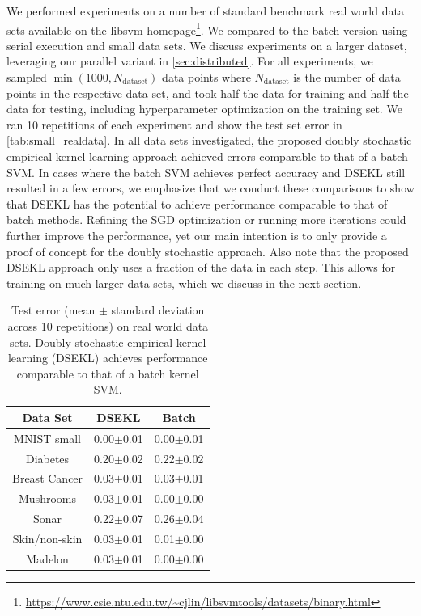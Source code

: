 \documentclass{article} %
\begin{document}
We performed experiments on a number of standard benchmark real world data sets available on the libsvm homepage\footnote{\url{https://www.csie.ntu.edu.tw/~cjlin/libsvmtools/datasets/binary.html}}. We compared to the batch version using serial execution and small data sets. We discuss experiments on a larger dataset, leveraging our parallel variant in \autoref{sec:distributed}. For all experiments, we sampled $\min(1000,N_{\text{dataset}})$ data points where $N_{\text{dataset}}$ is the number of data points in the respective data set, and took half the data for training and half the data for testing, including hyperparameter optimization on the training set. We ran 10 repetitions of each experiment and show the test set error in \autoref{tab:small_realdata}. In all data sets  investigated, the proposed doubly stochastic empirical kernel learning approach achieved errors comparable to that of a batch SVM. In cases where the batch SVM achieves perfect accuracy and DSEKL still resulted in a few errors, we emphasize that we conduct these comparisons to show that DSEKL has the potential to achieve performance comparable to that of batch methods. Refining the SGD optimization or running more iterations could further improve the performance, yet our main intention is to only provide a proof of concept for the doubly stochastic approach. Also note that the proposed DSEKL approach only uses a fraction of the data in each step. This allows for training on much larger data sets, which we discuss in the next section.
%
\begin{table}
\footnotesize
\begin{center}
\begin{tabular}{ ccc } 
Data Set & DSEKL & Batch\\
 \hline
MNIST small & 0.00$\pm$0.01  & 0.00$\pm$0.01\\
Diabetes & 0.20$\pm$0.02  & 0.22$\pm$0.02\\
Breast Cancer &  0.03$\pm$0.01 & 0.03$\pm$0.01\\
Mushrooms & 0.03$\pm$0.01 & 0.00$\pm$0.00\\
Sonar & 0.22$\pm$0.07 & 0.26$\pm$0.04\\
Skin/non-skin & 0.03$\pm$0.01 &  0.01$\pm$0.00\\
Madelon & 0.03$\pm$0.01 &  0.00$\pm$0.00\\
 \hline
\end{tabular}
\caption{\footnotesize Test error (mean $\pm$ standard deviation across 10 repetitions) on real world data sets. Doubly stochastic empirical kernel learning (DSEKL) achieves performance comparable to that of a batch kernel SVM. \label{tab:small_realdata}}
\end{center}
\end{table}
%
\end{document}

